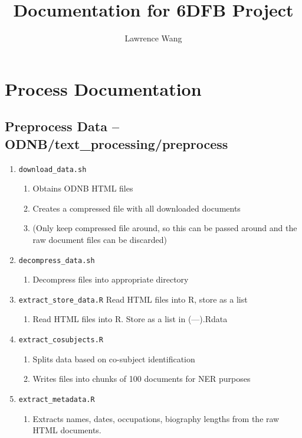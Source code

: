 \documentclass[11pt]{article}
\newcommand{\filename}[1]{\texttt{#1}}
\begin{document}
\title{Documentation for 6DFB Project}
\author{Lawrence Wang}

\maketitle
\tableofcontents
\pagebreak

\section{Process Documentation}

\subsection{Preprocess Data -- ODNB/text\_processing/preprocess}

\begin{enumerate}
\item \filename{download\_data.sh}
\begin{enumerate}
\item Obtains ODNB HTML files
\item Creates a compressed file with all downloaded documents
\item (Only keep compressed file around, so this can be passed around and the raw document files can be discarded)
\end{enumerate}

\item \filename{decompress\_data.sh} 
\begin{enumerate}
\item Decompress files into appropriate directory
\end{enumerate}

\item \filename{extract\_store\_data.R}
Read HTML files into R, store as a list
\begin{enumerate}
\item Read HTML files into R. Store as a list in (---).Rdata
\end{enumerate}

\item \filename{extract\_cosubjects.R}
\begin{enumerate}
\item Splits data based on co-subject identification
\item Writes files into chunks of 100 documents for NER purposes
\end{enumerate}
 
\item \filename{extract\_metadata.R}
\begin{enumerate}
\item Extracts names, dates, occupations, biography lengths from the raw HTML documents. 
\end{enumerate}

\end{enumerate}
\end{document}
